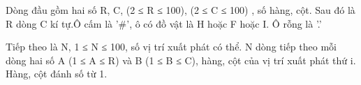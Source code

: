 Dòng đầu gồm hai số R, C, (2 ≤ R ≤ 100), (2 ≤ C ≤ 100) , số hàng, cột. Sau đó là R dòng C kí tự.Ô cấm là '\#', ô có đồ vật là H hoặc F hoặc I.  Ô rỗng là '.'  

   Tiếp theo là N, 1 ≤ N ≤ 100, số vị trí xuất phát có thể. N dòng tiếp theo mỗi dòng hai số A (1 ≤ A ≤ R) và B (1 ≤ B ≤ C),  hàng, cột của vị trí xuất phát thứ i.  Hàng, cột đánh số từ 1.
